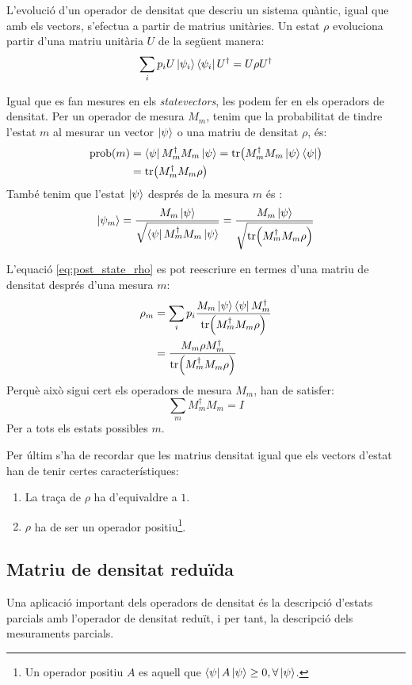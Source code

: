 L'evolució d'un operador de densitat que descriu un sistema quàntic, igual que amb els vectors, s'efectua a partir de matrius unitàries. Un estat $\rho$ evoluciona partir d'una matriu unitària $U$ de la següent manera:
$$
\sum_i p_i U \ket{\psi_i}\bra{\psi_i} U^\dagger = U\rho U^\dagger 
$$

Igual que es fan mesures en els \textit{statevectors}, les podem fer en els operadors de densitat. Per un operador de mesura $M_m$, tenim que la probabilitat de tindre l'estat $m$ al mesurar un vector $\ket{\psi}$ o una matriu de densitat $\rho$, és:
\begin{align*}
	\mathrm{prob}(m) &= \bra{\psi}M_m^\dagger M_m\ket{\psi} = \tr(M_m^\dagger M_m \ket{\psi}\bra{\psi})\\ &= \tr(M_m^\dagger M_m \rho)
\end{align*}
També tenim que l'estat $\ket{\psi}$ després de la mesura $m$ és \cite{QCandQI:density_matrix}:
\begin{equation}
	\ket{\psi_{m}} = \frac{M_m\ket{\psi}}{\sqrt{\bra{\psi}M_m^\dagger M_m \ket{\psi}}} = \frac{M_m\ket{\psi}}{\sqrt{\tr(M_m^\dagger M_m \rho)}}
	\label{eq:post_state_rho}
\end{equation}

L'equació \ref{eq:post_state_rho} es pot reescriure en termes d'una matriu de densitat després d'una mesura $m$:
\begin{align*}
	\rho_m &= \sum_i p_i \frac{M_m\ket{\psi}\bra{\psi}M_m^\dagger}{\tr(M_m^\dagger M_m \rho)} \\
	&= \frac{M_m\rho M_m^\dagger }{\tr(M_m^\dagger M_m\rho)}
\end{align*}
Perquè això sigui cert els operadors de mesura $M_m$, han de satisfer:
$$
\sum_m M_m^\dagger M_m = I
$$
Per a tots els estats possibles $m$.

Per últim s'ha de recordar que les matrius densitat igual que els vectors d'estat han de tenir certes característiques:
\begin{enumerate}
	\item La traça de $\rho$ ha d'equivaldre a $1$.
	\item $\rho$ ha de ser un operador positiu\footnote{Un operador positiu $A$ es aquell que $\bra{\psi}A\ket{\psi}\geq0, \forall \ket{\psi}$.}.
\end{enumerate}
\subsection{Matriu de densitat reduïda}
Una aplicació important dels operadors de densitat és la descripció d'estats parcials amb l'operador de densitat reduït, i per tant, la descripció dels mesuraments parcials.

